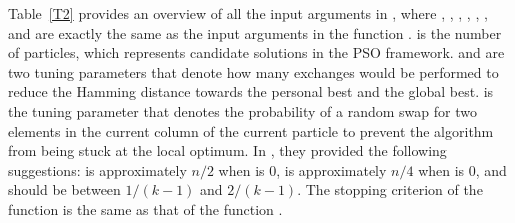Table~\ref{T2} provides an overview of all the input arguments in , where , , , , , , and  are exactly the same as the input arguments in the function .  is the number of particles, which represents candidate solutions in the PSO framework.  and  are two tuning parameters that denote how many exchanges would be performed to reduce the Hamming distance towards the personal best and the global best.  is the tuning parameter that denotes the probability of a random swap for two elements in the current column of the current particle to prevent the algorithm from being stuck at the local optimum. In \cite{chen2013optimizing}, they provided the following suggestions:  is approximately $n/2$ when  is $0$,  is approximately $n/4$ when  is $0$, and  should be between $1/(k-1)$ and $2/(k-1)$. The stopping criterion of the function is the same as that of the function .

